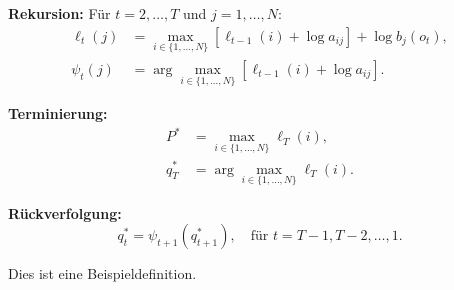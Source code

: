 \textbf{Rekursion:}
Für $t = 2, \ldots, T$ und $j = 1, \ldots, N$:
\begin{align}
  \ell_t(j) &= \max_{i \in \{1, \ldots, N\}} [\ell_{t-1}(i) + \log a_{ij}] + \log b_j(o_t), \\
  \psi_t(j) &= \arg\max_{i \in \{1, \ldots, N\}} [\ell_{t-1}(i) + \log a_{ij}].
\end{align}

\textbf{Terminierung:}
\begin{align}
  P^* &= \max_{i \in \{1, \ldots, N\}} \ell_T(i), \\
  q_T^* &= \arg\max_{i \in \{1, \ldots, N\}} \ell_T(i).
\end{align}

\textbf{Rückverfolgung:}
\begin{equation}
  q_t^* = \psi_{t+1}(q_{t+1}^*), \quad \text{für } t = T-1, T-2, \ldots, 1.
\end{equation}

\begin{definition}[Beispieldefinition]
Dies ist eine Beispieldefinition.
\end{definition}
